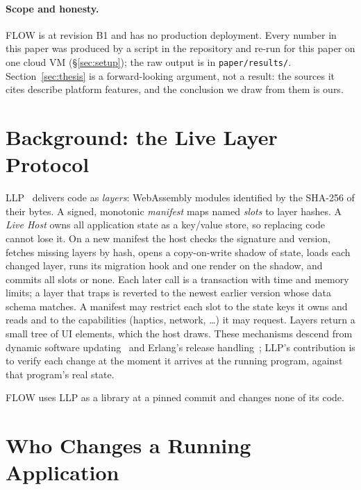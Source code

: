\documentclass[10pt,twocolumn]{article}
\newcommand{\code}[1]{\texttt{#1}}
\begin{document}
\paragraph{Scope and honesty.} FLOW is at revision B1 and has no production deployment. Every
number in this paper was produced by a script in the repository and re-run for this paper on one
cloud VM (\S\ref{sec:setup}); the raw output is in \code{paper/results/}. Section~\ref{sec:thesis}
is a forward-looking argument, not a result: the sources it cites describe platform features, and
the conclusion we draw from them is ours.

\section{Background: the Live Layer Protocol}
\label{sec:llp}

LLP~\cite{llp2026} delivers code as \emph{layers}: WebAssembly modules identified by the SHA-256 of
their bytes. A signed, monotonic \emph{manifest} maps named \emph{slots} to layer hashes. A
\emph{Live Host} owns all application state as a key/value store, so replacing code cannot lose it.
On a new manifest the host checks the signature and version, fetches missing layers by hash, opens
a copy-on-write shadow of state, loads each changed layer, runs its migration hook and one render on
the shadow, and commits all slots or none. Each later call is a transaction with time and memory
limits; a layer that traps is reverted to the newest earlier version whose data schema matches.
A manifest may restrict each slot to the state keys it owns and reads and to the capabilities
(haptics, network, \ldots) it may request. Layers return a small tree of UI elements, which the host
draws. These mechanisms descend from dynamic software updating~\cite{hicks2005dsu} and Erlang's
release handling~\cite{armstrong2003}; LLP's contribution is to verify each change at the moment it
arrives at the running program, against that program's real state.

FLOW uses LLP as a library at a pinned commit and changes none of its code.

\section{Who Changes a Running Application}
\label{sec:model}
\end{document}
